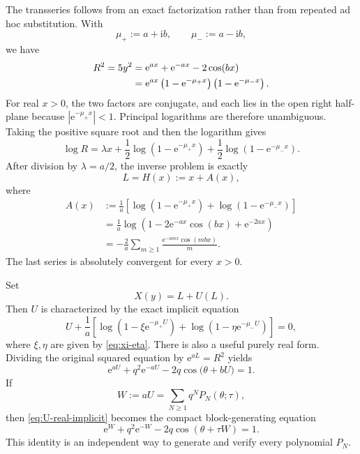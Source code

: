 \documentclass[11pt,oneside]{article}
\numberwithin{equation}{section}
\newcommand{\e}{\mathrm{e}}
\newcommand{\ii}{\mathrm{i}}
\begin{document}
The transseries follows from an exact factorization rather than from repeated
ad hoc substitution.  With
\begin{equation}
  \mu_+:=a+\ii b,
  \qquad
  \mu_-:=a-\ii b,
  \label{eq:mu-pm}
\end{equation}
we have
\begin{align}
  R^2=5y^2
   &=\e^{ax}+\e^{-ax}-2\cos(bx)\notag\\
   &=\e^{ax}\left(1-\e^{-\mu_+x}\right)
                 \left(1-\e^{-\mu_-x}\right).
  \label{eq:factorization}
\end{align}
For real \(x>0\), the two factors are conjugate, and each lies in the open
right half-plane because \(|\e^{-\mu_\pm x}|<1\).  Principal logarithms are
therefore unambiguous.  Taking the positive square root and then the logarithm
gives
\begin{equation}
  \log R=\lambda x+\frac12\log\left(1-\e^{-\mu_+x}\right)
                    +\frac12\log\left(1-\e^{-\mu_-x}\right).
  \label{eq:log-factorization}
\end{equation}
After division by \(\lambda=a/2\), the inverse problem is exactly
\begin{equation}
  L=H(x):=x+A(x),
  \label{eq:H-near-identity}
\end{equation}
where
\begin{align}
  A(x)
  &:=\frac1a\left[
       \log\left(1-\e^{-\mu_+x}\right)
      +\log\left(1-\e^{-\mu_-x}\right)
      \right]
  \label{eq:A-complex}\\
  &=\frac1a\log\left(1-2\e^{-ax}\cos(bx)+\e^{-2ax}\right)
  \label{eq:A-real}\\
  &=-\frac2a\sum_{m\ge1}\frac{\e^{-amx}\cos(mbx)}m.
  \label{eq:A-Fourier}
\end{align}
The last series is absolutely convergent for every \(x>0\).

Set
\begin{equation}
  X(y)=L+U(L).
  \label{eq:X-L-U}
\end{equation}
Then \(U\) is characterized by the exact implicit equation
\begin{equation}
 U+\frac1a\left[
 \log\left(1-\xi\e^{-\mu_+U}\right)
 +\log\left(1-\eta\e^{-\mu_-U}\right)
 \right]=0,
 \label{eq:U-complex-implicit}
\end{equation}
where \(\xi,\eta\) are given by \cref{eq:xi-eta}.  There is also a useful
purely real form.  Dividing the original squared equation by
\(\e^{aL}=R^2\) yields
\begin{equation}
  \e^{aU}+q^2\e^{-aU}-2q\cos\bigl(\theta+bU\bigr)=1.
  \label{eq:U-real-implicit}
\end{equation}
If
\begin{equation}
  W:=aU=\sum_{N\ge1}q^NP_N(\theta;\tau),
  \label{eq:W-def}
\end{equation}
then \cref{eq:U-real-implicit} becomes the compact block-generating equation
\begin{equation}
  \boxed{
  \e^W+q^2\e^{-W}-2q\cos(\theta+\tau W)=1.
  }
  \label{eq:P-generating-equation}
\end{equation}
This identity is an independent way to generate and verify every polynomial
\(P_N\).
\end{document}
